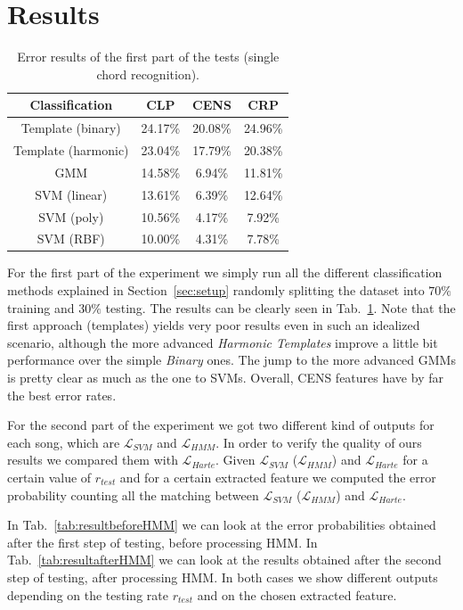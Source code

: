 \section{Results}
\label{sec:results}

\begin{table}[t]
	\centering
	\begin{tabular}{|c|ccc|}
		\hline 
		Classification & CLP & CENS & CRP \\ 
		\hline 
		Template (binary) & 24.17\% & 20.08\% & 24.96\% \\
		Template (harmonic) & 23.04\% & 17.79\% & 20.38\% \\
		GMM & 14.58\% & 6.94\% & 11.81\% \\ 
		\hline 
		SVM (linear) & 13.61\% & 6.39\% & 12.64\% \\ 
		SVM (poly) & 10.56\% & 4.17\% & 7.92\% \\ 
		SVM (RBF) & 10.00\% & 4.31\% & 7.78\% \\ 
		\hline 
	\end{tabular}
	\caption{Error results of the first part of the tests (single chord recognition).}
	\label{tab:singleChordResults}
\end{table}

For the first part of the experiment we simply run all the different classification methods explained in Section~\ref{sec:setup} randomly splitting the dataset into $70\%$ training and $30\%$ testing. The results can be clearly seen in Tab.~\ref{tab:singleChordResults}. Note that the first approach (templates) yields very poor results even in such an idealized scenario, although the more advanced \textit{Harmonic Templates} improve a little bit performance over the simple \textit{Binary} ones. The jump to the more advanced GMMs is pretty clear as much as the one to SVMs. Overall, CENS features have by far the best error rates.

For the second part of the experiment we got two different kind of outputs for each song, which are $\mathcal{L}_{SVM}$ and $\mathcal{L}_{HMM}$. In order to verify the quality of ours results we compared them with  $\mathcal{L}_{Harte}$. Given $\mathcal{L}_{SVM}$ ($\mathcal{L}_{HMM}$) and $\mathcal{L}_{Harte}$ for a certain value of $r_{test}$ and for a certain extracted feature we computed the error probability counting all the matching between $\mathcal{L}_{SVM}$ ($\mathcal{L}_{HMM}$) and $\mathcal{L}_{Harte}$.

 In Tab.~\ref{tab:resultbeforeHMM} we can look at the error probabilities obtained after the first step of testing, before processing HMM. In Tab.~\ref{tab:resultafterHMM} we can look at the results obtained after the second step of testing, after processing HMM. In both cases we show different outputs depending on the testing rate $r_{test}$ and on the chosen extracted feature.

